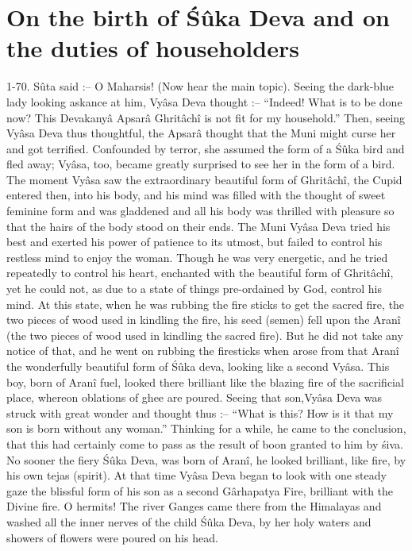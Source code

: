 \chapter{On the birth of \'S\^uka Deva and on the duties of householders}

1-70. S\^uta said :-- O Maharsis! (Now hear the main topic). Seeing the dark-blue lady looking askance at him, Vy\^asa Deva thought :-- ``Indeed! What is to be done now? This Devakany\^a Apsar\^a Ghrit\^ach\^i is not fit for my household.'' Then, seeing Vy\^asa Deva thus thoughtful, the Apsar\^a thought that the Muni might curse her and got terrified. Confounded by terror, she assumed the form of a \'S\^uka bird and fled away; Vy\^asa, too, became greatly surprised to see her in the form of a bird. The moment Vy\^asa saw the extraordinary beautiful form of Ghrit\^ach\^i, the Cupid entered then, into his body, and his mind was filled with the thought of sweet feminine form and was gladdened and all his body was thrilled with pleasure so that the hairs of the body stood on their ends. The Muni Vy\^asa Deva tried his best and exerted his power of patience to its utmost, but failed to control his restless mind to enjoy the woman. Though he was very energetic, and he tried repeatedly to control his heart, enchanted with the beautiful form of Ghrit\^ach\^i, yet he could not, as due to a state of things pre-ordained by God, control his mind. At this state, when he was rubbing the fire sticks to get the sacred fire, the two pieces of wood used in kindling the fire, his seed (semen) fell upon the Aran\^i (the two pieces of wood used in kindling the sacred fire). But he did not take any notice of that, and he went on rubbing the firesticks when arose from that Aran\^i the wonderfully beautiful form of \'S\^uka deva, looking like a second Vy\^asa. This boy, born of Aran\^i fuel, looked there brilliant like the blazing fire of the sacrificial place, whereon oblations of ghee are poured. Seeing that son,Vy\^asa Deva was struck with great wonder and thought thus :-- ``What is this? How is it that my son is born without any woman.'' Thinking for a while, he came to the conclusion, that this had certainly come to pass as the result of boon granted to him by \'siva. No sooner the fiery \'S\^uka Deva, was born of Aran\^i, he looked brilliant, like fire, by his own tejas (spirit). At that time Vy\^asa Deva began to look with one steady gaze the blissful form of his son as a second G\^arhapatya Fire, brilliant with the Divine fire. O hermits! The river Ganges came there from the Himalayas and washed all the inner nerves of the child \'S\^uka Deva, by her holy waters and showers of flowers were poured on his head.

